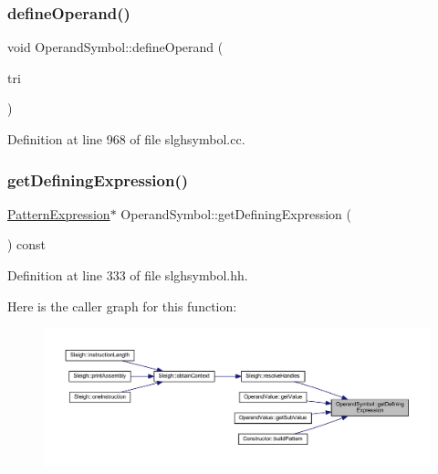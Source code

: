 \subsubsection{\texorpdfstring{defineOperand()}{defineOperand()}\hspace{0.1cm}{\footnotesize\ttfamily [2/2]}}
{\footnotesize\ttfamily void Operand\+Symbol\+::define\+Operand (\begin{DoxyParamCaption}\item[{\mbox{\hyperlink{class_triple_symbol}{Triple\+Symbol}} $\ast$}]{tri }\end{DoxyParamCaption})}



Definition at line 968 of file slghsymbol.\+cc.

\mbox{\label{class_operand_symbol_ac93d6e408054938945aa9fc8cd6fcc38}} 
\subsubsection{\texorpdfstring{getDefiningExpression()}{getDefiningExpression()}}
{\footnotesize\ttfamily \mbox{\hyperlink{class_pattern_expression}{Pattern\+Expression}}$\ast$ Operand\+Symbol\+::get\+Defining\+Expression (\begin{DoxyParamCaption}\item[{void}]{ }\end{DoxyParamCaption}) const\hspace{0.3cm}{\ttfamily [inline]}}



Definition at line 333 of file slghsymbol.\+hh.

Here is the caller graph for this function\+:
\nopagebreak
\begin{figure}[H]
\begin{center}
\leavevmode
\includegraphics[width=350pt]{class_operand_symbol_ac93d6e408054938945aa9fc8cd6fcc38_icgraph}
\end{center}
\end{figure}
\mbox{\label{class_operand_symbol_ac13b93b87472c1980d6cad5be122997a}} 

